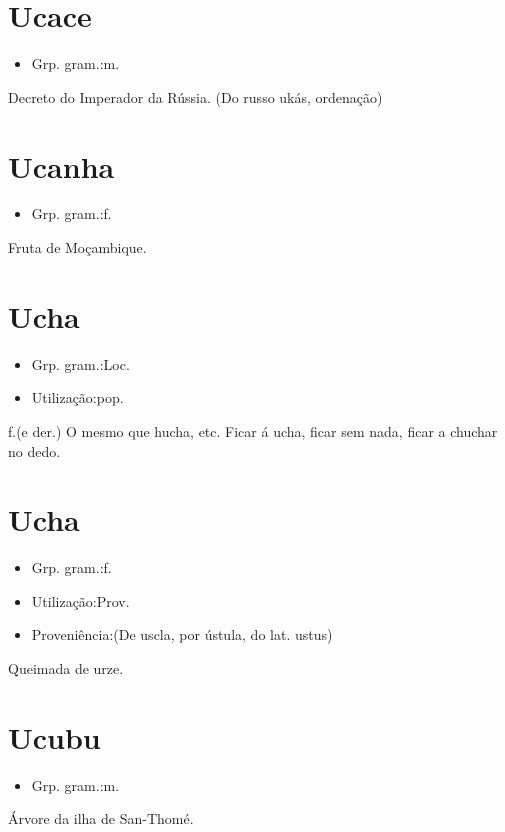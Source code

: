 \documentclass{article}
\begin{document}
\section{Ucace}
\begin{itemize}
\item {Grp. gram.:m.}
\end{itemize}
Decreto do Imperador da Rússia.
(Do russo \textunderscore ukás\textunderscore , ordenação)
\section{Ucanha}
\begin{itemize}
\item {Grp. gram.:f.}
\end{itemize}
Fruta de Moçambique.
\section{Ucha}
\begin{itemize}
\item {Grp. gram.:Loc.}
\end{itemize}
\begin{itemize}
\item {Utilização:pop.}
\end{itemize}
\textunderscore f.\textunderscore  (e der.)
O mesmo que \textunderscore hucha\textunderscore , etc.
\textunderscore Ficar á ucha\textunderscore , ficar sem nada, ficar a chuchar no dedo.
\section{Ucha}
\begin{itemize}
\item {Grp. gram.:f.}
\end{itemize}
\begin{itemize}
\item {Utilização:Prov.}
\end{itemize}
\begin{itemize}
\item {Proveniência:(De \textunderscore uscla\textunderscore , por \textunderscore ústula\textunderscore , do lat. \textunderscore ustus\textunderscore )}
\end{itemize}
Queimada de urze.
\section{Ucubu}
\begin{itemize}
\item {Grp. gram.:m.}
\end{itemize}
Árvore da ilha de San-Thomé.
\end{document}
